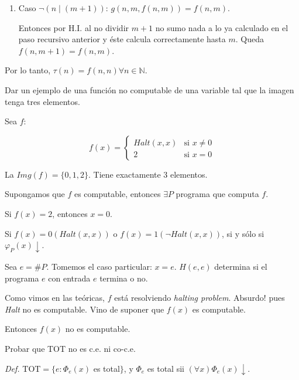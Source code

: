 \begin{questions}
\begin{solution}
\begin{itemize}
\begin{enumerate}[1.]
   \item Caso $\neg (n \mid (m+1))$: $g(n,m,f(n,m)) = f(n,m)$. 
   
    Entonces por H.I. al no dividir $m+1$ no sumo nada a lo ya calculado en el paso recursivo anterior y éste calcula correctamente hasta $m$. Queda $f(n,m+1)=f(n,m)$.
  \end{enumerate}

 Por lo tanto, $\tau(n) = f(n,n) \forall n \in \mathbb{N}$.
 
\end{itemize}

\end{solution} 

\question Dar un ejemplo de una funci\'on no computable de una variable tal que la imagen tenga tres elementos. 


\begin{solution}
Sea $f$: 

$$
f(x) = \left\{
\begin{array}{cl}
Halt(x,x) & \mbox{si } x \neq 0 \\
2 & \mbox{si } x = 0
\end{array}\right.
$$

La $Img(f) = \{0,1,2\}$. Tiene exactamente 3 elementos.

Supongamos que $f$ es computable, entonces $\exists P$ programa que computa $f$. 

Si $f(x) = 2$, entonces $x = 0$. 

Si $f(x) = 0 (Halt(x,x))$ o $f(x) = 1 (\neg Halt(x,x))$, si y s\'olo si $\varphi_P(x)\downarrow$.

Sea $e = \#P$. Tomemos el caso particular: $x = e$. $H(e,e)$ determina si el programa $e$ con entrada $e$ termina o no. 

Como vimos en las te\'oricas, $f$ est\'a resolviendo {\it halting problem}. Absurdo! pues {\it Halt} no es computable. Vino de suponer que $f(x)$ es computable. 

Entonces $f(x)$ no es computable. 

\end{solution}

\question Probar que TOT no es c.e. ni co-c.e.


\begin{solution}

 {\it Def. } TOT$=\{ e : \Phi_e(x)$ es total$\}$, y $\Phi_e$ es total sii $(\forall x)\Phi_e(x)\downarrow$.
 

\end{solution}
\end{questions}
